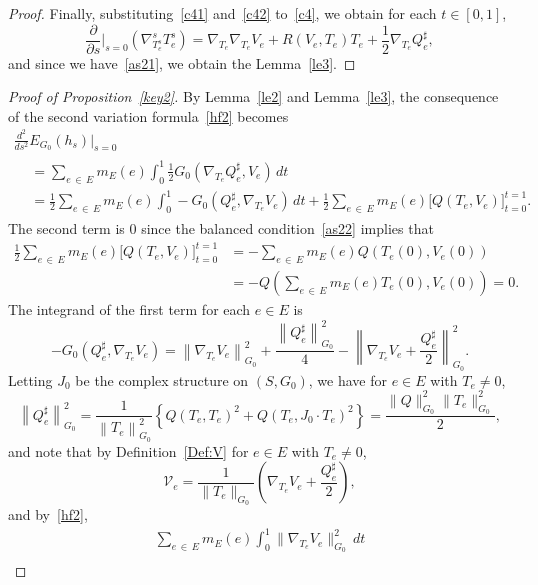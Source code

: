 \documentclass[11pt]{article}
\theoremstyle{definition}
\numberwithin{equation}{section}
\newcommand{\p}{\psi}
\newcommand*\Vc{\mathcal{V}}
\renewcommand*\p{\partial}
\begin{document}
\begin{proof}
Finally, substituting~\eqref{c41} and~\eqref{c42} to~\eqref{c4}, we obtain for each $t \in [0, 1]$,
\[
\frac{\p}{\p s}\Big|_{s=0}\left(\nabla^s_{T_e^s}T_e^s\right)=\nabla_{T_e}\nabla_{T_e}V_e+R\left(V_e, T_e\right)T_e+\frac{1}{2}\nabla_{T_e}Q_e^{\sharp},
\]
and since we have~\eqref{as21}, we obtain the Lemma~\ref{le3}.
\end{proof}



\begin{proof}[{Proof of Proposition~\ref{key2}}]
By Lemma~\ref{le2} and Lemma~\ref{le3}, the consequence of the second variation formula~\eqref{hf2} becomes
\begin{multline*}
\frac{d^2}{d s^2} E_{G_0}(h_{s})\Big|_{s=0}\\
\begin{aligned}
&=\sum_{e\,\in\,E}m_E(e)\int_0^1 \frac{1}{2}G_0\left(\nabla_{T_e}Q_{e}^{\sharp},V_e\right) \,dt\\
&= \frac{1}{2}\sum_{e\,\in\,E}m_E(e)\int_0^1-G_0\left(Q_e^{\sharp},\nabla_{T_e}V_e\right)\,dt+\frac{1}{2}\sum_{e\,\in\,E}m_E(e)\Big[Q\left(T_e,V_e\right)\Big]_{t=0}^{t=1}.
\end{aligned}
\end{multline*}
The second term is $0$ since the balanced condition~\eqref{as22} implies that
\begin{align*}
\frac{1}{2}\sum_{e\,\in\,E}m_E(e)\Big[Q\left(T_e,V_e\right)\Big]_{t=0}^{t=1} &=-\sum_{e\,\in\,E}m_E(e)Q\left({T_e}(0), V_e(0)\right)\\
&=-Q\left(\sum_{e\,\in\,E}m_E(e)T_e(0), V_e(0)\right)=0.
\end{align*}
The integrand of the first term for each $e \in E$ is
\begin{equation}\label{svf3}
-G_0\left(Q_e^{\sharp}, \nabla_{T_e}V_e\right) =\left\|\nabla_{T_e}V_e\right\|_{G_0}^2+\frac{\left\|Q_e^{\sharp}\right\|_{G_0}^2}{4}-\left\|\nabla_{T_e}V_e+\frac{Q_e^{\sharp}}{2}\right\|^2_{G_0}.
\end{equation}
Letting $J_0$ be the complex structure on $(S, G_0)$, we have for $e \in E$ with $T_e \neq 0$,
\[
\left\|Q_e^{\sharp}\right\|_{G_0}^2=\frac{1}{{\left\|T_e\right\|_{G_0}^2}}\left\{Q \left(T_e,T_e\right)^2+Q\left(T_e, J_0 \cdot T_e\right)^2\right\} =\frac{\|Q\|_{G_0}^2\|T_e\|_{G_0}^2}{2},
\]
and note that by Definition~\ref{Def:V} for $e \in E$ with $T_e \neq 0$,
\[
\Vc_e=\frac{1}{\|T_e\|_{G_0}}\left(\nabla_{T_e}V_e+\frac{Q_e^{\sharp}}{2}\right),
\]
and by~\eqref{hf2},
\begin{multline*}
\sum_{e\,\in\,E}m_E(e)\int_0^1\|\nabla_{T_e}V_e\|_{G_0}^2\, dt \\

\end{multline*}
\end{proof}
\end{document}
